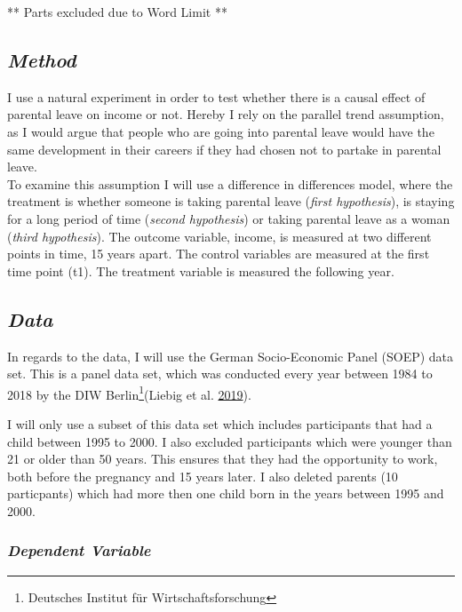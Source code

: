 \documentclass[
  11pt,
]{article}
\begin{document}
** Parts excluded due to Word Limit **

\hypertarget{method}{%
\subsection*{\texorpdfstring{\emph{Method}}{Method}}\label{method}}

I use a natural experiment in order to test whether there is a causal effect of parental leave on income or not. Hereby I rely on the parallel trend assumption, as I would argue that people who are going into parental leave would have the same development in their careers if they had chosen not to partake in parental leave.\\
To examine this assumption I will use a difference in differences model, where the treatment is whether someone is taking parental leave (\emph{first hypothesis}), is staying for a long period of time (\emph{second hypothesis}) or taking parental leave as a woman (\emph{third hypothesis}).
The outcome variable, income, is measured at two different points in time, 15 years apart. The control variables are measured at the first time point (t1). The treatment variable is measured the following year.

\hypertarget{data}{%
\subsection*{\texorpdfstring{\emph{Data}}{Data}}\label{data}}

In regards to the data, I will use the German Socio-Economic Panel (SOEP) data set. This is a panel data set, which was conducted every year between 1984 to 2018 by the DIW Berlin\footnote{Deutsches Institut für Wirtschaftsforschung}(Liebig et al. \protect\hyperlink{ref-liebig_socio-economic_2019}{2019}).

I will only use a subset of this data set which includes participants that had a child between 1995 to 2000.
I also excluded participants which were younger than 21 or older than 50 years. This ensures that they had the opportunity to work, both before the pregnancy and 15 years later. I also deleted parents (10 particpants) which had more then one child born in the years between 1995 and 2000.

\hypertarget{dependent-variable}{%
\subsubsection*{\texorpdfstring{\emph{Dependent Variable}}{Dependent Variable}}\label{dependent-variable}}
\end{document}
